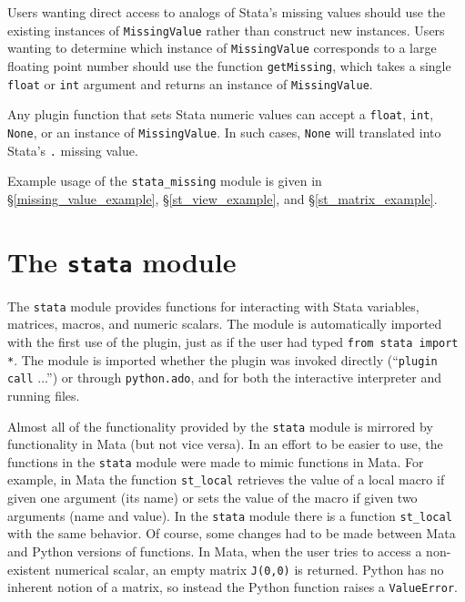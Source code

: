 \documentclass{article}
\begin{document}
Users wanting direct access to analogs of Stata's missing values should use the existing instances of \lstinline$MissingValue$ rather than construct new instances. Users wanting to determine which instance of \lstinline$MissingValue$ corresponds to a large floating point number should use the function \lstinline$getMissing$, which takes a single \lstinline{float} or \lstinline{int} argument and returns an instance of \lstinline{MissingValue}. 
	
Any plugin function that sets Stata numeric values can accept a \lstinline{float}, \lstinline{int}, \lstinline$None$, or an instance of \lstinline{MissingValue}. In such cases, \lstinline$None$ will translated into Stata's \lstinline$.$ missing value.
	
Example usage of the \lstinline{stata_missing} module is given in \S\ref{missing_value_example}, \S\ref{st_view_example}, and \S\ref{st_matrix_example}.



\section{The \lstinline$stata$ module} \label{stata_module}
	
The \lstinline$stata$ module provides functions for interacting with Stata variables, matrices, macros, and numeric scalars. The module is automatically imported with the first use of the plugin, just as if the user had typed \lstinline$from stata import *$. The module is imported whether the plugin was invoked directly (``\lstinline$plugin call$ ...'') or through \lstinline$python.ado$, and for both the interactive interpreter and running files. 
			
Almost all of the functionality provided by the \lstinline$stata$ module is mirrored by functionality in Mata (but not vice versa). In an effort to be easier to use, the functions in the \lstinline$stata$ module were made to mimic functions in Mata. For example, in Mata the function \lstinline$st_local$ retrieves the value of a local macro if given one argument (its name) or sets the value of the macro if given two arguments (name and value). In the \lstinline$stata$ module there is a function \lstinline$st_local$ with the same behavior. Of course, some changes had to be made between Mata and Python versions of functions. In Mata, when the user tries to access a non-existent numerical scalar, an empty matrix \lstinline$J(0,0)$ is returned. Python has no inherent notion of a matrix, so instead the Python function raises a \lstinline{ValueError}.
			
\end{document}
